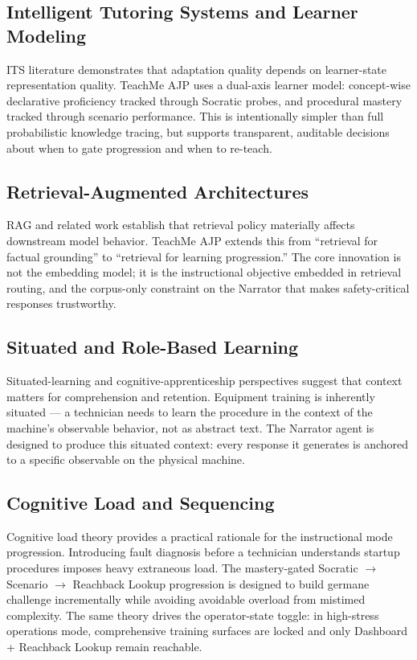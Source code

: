\documentclass[11pt,letterpaper]{article}
\newcommand{\arrowto}{$\rightarrow$}
\begin{document}
\subsection{Intelligent Tutoring Systems and Learner Modeling}
ITS literature demonstrates that adaptation quality depends on learner-state representation quality. TeachMe AJP uses a dual-axis learner model: concept-wise declarative proficiency tracked through Socratic probes, and procedural mastery tracked through scenario performance. This is intentionally simpler than full probabilistic knowledge tracing, but supports transparent, auditable decisions about when to gate progression and when to re-teach.

\subsection{Retrieval-Augmented Architectures}
RAG and related work establish that retrieval policy materially affects downstream model behavior. TeachMe AJP extends this from ``retrieval for factual grounding'' to ``retrieval for learning progression.'' The core innovation is not the embedding model; it is the instructional objective embedded in retrieval routing, and the corpus-only constraint on the Narrator that makes safety-critical responses trustworthy.

\subsection{Situated and Role-Based Learning}
Situated-learning and cognitive-apprenticeship perspectives suggest that context matters for comprehension and retention. Equipment training is inherently situated --- a technician needs to learn the procedure in the context of the machine's observable behavior, not as abstract text. The Narrator agent is designed to produce this situated context: every response it generates is anchored to a specific observable on the physical machine.

\subsection{Cognitive Load and Sequencing}
Cognitive load theory provides a practical rationale for the instructional mode progression. Introducing fault diagnosis before a technician understands startup procedures imposes heavy extraneous load. The mastery-gated Socratic \arrowto{} Scenario \arrowto{} Reachback Lookup progression is designed to build germane challenge incrementally while avoiding avoidable overload from mistimed complexity. The same theory drives the operator-state toggle: in high-stress operations mode, comprehensive training surfaces are locked and only Dashboard + Reachback Lookup remain reachable.
\end{document}
